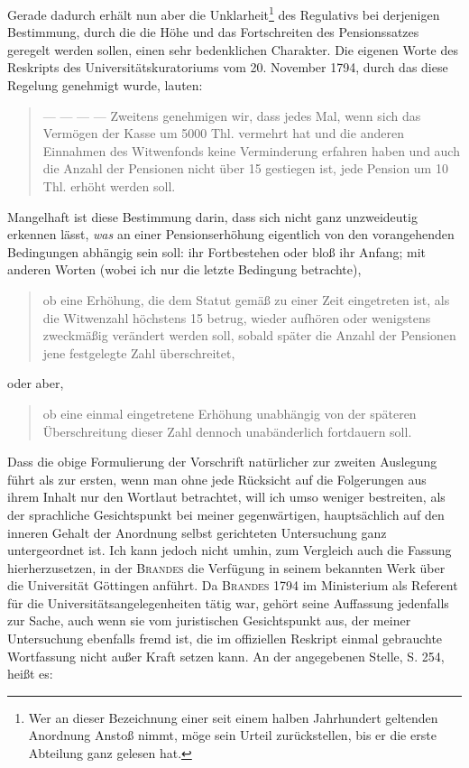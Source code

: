 \par{}
Gerade dadurch erhält nun aber die Unklarheit\footnote{Wer an dieser Bezeichnung einer seit einem halben Jahrhundert geltenden Anordnung Anstoß nimmt, möge sein Urteil zurückstellen, bis er die erste Abteilung ganz gelesen hat.} des Regulativs bei derjenigen Bestimmung, durch die die Höhe und das Fortschreiten des Pensionssatzes geregelt werden sollen, einen sehr bedenklichen Charakter. Die eigenen Worte des Reskripts des Universitätskuratoriums vom 20. November 1794, durch das diese Regelung genehmigt wurde, lauten:
\begin{quote}
— — — — Zweitens genehmigen wir, dass jedes Mal, wenn sich das Vermögen der Kasse um 5000 Thl. vermehrt hat und die anderen Einnahmen des Witwenfonds keine Verminderung erfahren haben und auch die Anzahl der Pensionen nicht über 15 gestiegen ist, jede Pension um 10 Thl. erhöht werden soll.
\end{quote}
\noindent\hspace*{\parindent}Mangelhaft ist diese Bestimmung darin, dass sich nicht ganz unzweideutig erkennen lässt, \textit{was} an einer Pensionserhöhung eigentlich von den vorangehenden Bedingungen abhängig sein soll: ihr Fortbestehen oder bloß ihr Anfang; mit anderen Worten (wobei ich nur die letzte Bedingung betrachte),
\begin{quote}
ob eine Erhöhung, die dem Statut gemäß zu einer Zeit eingetreten ist, als die Witwenzahl höchstens 15 betrug, wieder aufhören oder wenigstens zweckmäßig verändert werden soll, sobald später die Anzahl der Pensionen jene festgelegte Zahl überschreitet,
\end{quote}
oder aber,
\begin{quote}
ob eine einmal eingetretene Erhöhung unabhängig von der späteren Überschreitung dieser Zahl dennoch unabänderlich fortdauern soll.
\end{quote}
\noindent\hspace*{\parindent}Dass die obige Formulierung der Vorschrift natürlicher zur zweiten Auslegung führt als zur ersten, wenn man ohne jede Rücksicht auf die Folgerungen aus ihrem Inhalt nur den Wortlaut betrachtet, will ich umso weniger bestreiten, als der sprachliche Gesichtspunkt bei meiner gegenwärtigen, hauptsächlich auf den inneren Gehalt der Anordnung selbst gerichteten Untersuchung ganz untergeordnet ist. Ich kann jedoch nicht umhin, zum Vergleich auch die Fassung hierherzusetzen, in der \textsc{Brandes} die Verfügung in seinem bekannten Werk über die Universität Göttingen anführt. Da \textsc{Brandes} 1794 im Ministerium als Referent für die Universitätsangelegenheiten tätig war, gehört seine Auffassung jedenfalls zur Sache, auch wenn sie vom juristischen Gesichtspunkt aus, der meiner Untersuchung ebenfalls fremd ist, die im offiziellen Reskript einmal gebrauchte Wortfassung nicht außer Kraft setzen kann. An der angegebenen Stelle, S. 254, heißt es:
